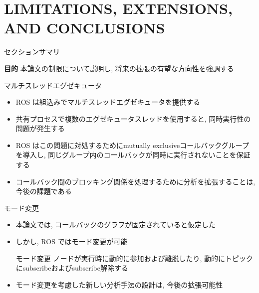 
\section{LIMITATIONS, EXTENSIONS, AND CONCLUSIONS}
\label{sec: limitations, extensions, and conclusions}

\begin{frame}{セクションサマリ}
    \begin{itembox}[l]{\textbf{目的}}
        本論文の制限について説明し, 将来の拡張の有望な方向性を強調する
    \end{itembox}
\end{frame}

\begin{frame}{マルチスレッドエグゼキュータ}
    \begin{itemize}
        \item ROS は組込みでマルチスレッドエグゼキュータを提供する
        \item 共有プロセスで複数のエグゼキュータスレッドを使用すると, 同時実行性の問題が発生する
        \item ROS はこの問題に対処するためにmutually exclusiveコールバックグループを導入し, 同じグループ内のコールバックが同時に実行されないことを保証する
        \item コールバック間のブロッキング関係を処理するために分析を拡張することは, 今後の課題である
    \end{itemize}
\end{frame}

\begin{frame}{モード変更}
    \begin{itemize}
        \item 本論文では, コールバックのグラフが固定されていると仮定した
        \item しかし, ROS ではモード変更が可能
              \begin{block}{モード変更}
                  ノードが実行時に動的に参加および離脱したり, 動的にトピックにsubscribeおよびsubscribe解除する
              \end{block}
              \vspace{5mm}
        \item モード変更を考慮した新しい分析手法の設計は, 今後の拡張可能性
    \end{itemize}
\end{frame}

